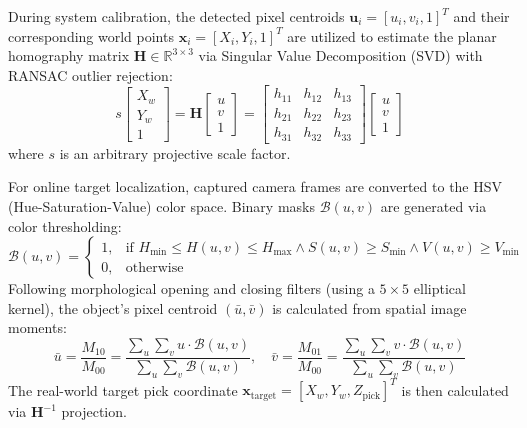 \documentclass[runningheads]{llncs}
\begin{document}
During system calibration, the detected pixel centroids $\mathbf{u}_i = [u_i, v_i, 1]^T$ and their corresponding world points $\mathbf{x}_i = [X_i, Y_i, 1]^T$ are utilized to estimate the planar homography matrix $\mathbf{H} \in \mathbb{R}^{3 \times 3}$ via Singular Value Decomposition (SVD) with RANSAC outlier rejection:
\begin{equation}
    s \begin{bmatrix} X_w \\ Y_w \\ 1 \end{bmatrix} = \mathbf{H} \begin{bmatrix} u \\ v \\ 1 \end{bmatrix} = \begin{bmatrix} h_{11} & h_{12} & h_{13} \\ h_{21} & h_{22} & h_{23} \\ h_{31} & h_{32} & h_{33} \end{bmatrix} \begin{bmatrix} u \\ v \\ 1 \end{bmatrix}
\end{equation}
where $s$ is an arbitrary projective scale factor.

For online target localization, captured camera frames are converted to the HSV (Hue-Saturation-Value) color space. Binary masks $\mathcal{B}(u,v)$ are generated via color thresholding:
\begin{equation}
    \mathcal{B}(u,v) = \begin{cases} 1, & \text{if } H_{\text{min}} \le H(u,v) \le H_{\text{max}} \land S(u,v) \ge S_{\text{min}} \land V(u,v) \ge V_{\text{min}} \\ 0, & \text{otherwise} \end{cases}
\end{equation}
Following morphological opening and closing filters (using a $5\times 5$ elliptical kernel), the object's pixel centroid $(\bar{u}, \bar{v})$ is calculated from spatial image moments:
\begin{equation}
    \bar{u} = \frac{M_{10}}{M_{00}} = \frac{\sum_u \sum_v u \cdot \mathcal{B}(u,v)}{\sum_u \sum_v \mathcal{B}(u,v)}, \quad \bar{v} = \frac{M_{01}}{M_{00}} = \frac{\sum_u \sum_v v \cdot \mathcal{B}(u,v)}{\sum_u \sum_v \mathcal{B}(u,v)}
\end{equation}
The real-world target pick coordinate $\mathbf{x}_{\text{target}} = [X_w, Y_w, Z_{\text{pick}}]^T$ is then calculated via $\mathbf{H}^{-1}$ projection.
\end{document}
